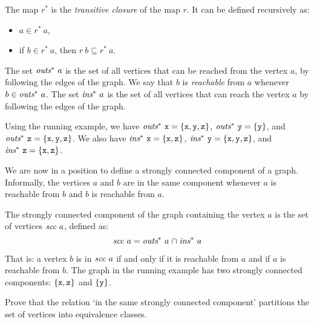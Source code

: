 \begin{definition}
The map $r^\ast$ is the {\em transitive closure\/} of the map $r$.  It can be defined recursively as:
\begin{itemize}
\item $a \in r^\ast ~ a$,
\item if $b \in r^\ast ~ a$, then
$r ~b \subseteq r^\ast~ a$.
\end{itemize}
\end{definition}
The set $\mbox{\it outs}^\ast ~a$ is the set of all vertices that can
be reached from the vertex $a$, by following the edges of the graph.
We say that $b$ is {\em reachable\/} from $a$ whenever $b\in\mbox{\it outs}^\ast ~a$.  The set
$\mbox{\it ins}^\ast~ a$ is the set of all vertices that can reach the
vertex $a$ by following the edges of the graph.

Using the running example, we have $\mbox{\it outs}^\ast~ \mbox{\tt x} =
\{\mbox{\tt x},\mbox{\tt y},\mbox{\tt z}\}$, $\mbox{\it outs}^\ast~ \mbox{\tt y} = \{\mbox{\tt y}\}$, and
$\mbox{\it outs}^\ast~ \mbox{\tt z} = \{\mbox{\tt x},\mbox{\tt y},\mbox{\tt z}\}$. We also have $\mbox{\it
ins}^\ast~ \mbox{\tt x} = \{\mbox{\tt x},\mbox{\tt z}\}$, $\mbox{\it ins}^\ast~ \mbox{\tt y} =
\{\mbox{\tt x},\mbox{\tt y},\mbox{\tt z}\}$, and $\mbox{\it ins}^\ast~ \mbox{\tt z} = \{\mbox{\tt x},\mbox{\tt z}\}$.

We are now in a position to define a strongly connected component
of a graph. Informally, the vertices $a$ and $b$ are in the same
component whenever $a$ is reachable from $b$ and $b$ is reachable from
$a$.
\begin{definition}
The strongly connected component of the graph containing the vertex
$a$ is the set of vertices $\mbox{\it scc} ~a$, defined as:
\[\mbox{\it scc} ~a = \mbox{\it outs}^\ast ~a \mathrel{\cap}
                      \mbox{\it ins}^\ast ~a \]
\end{definition}
That is: a vertex $b$ is in $\mbox{\it scc} ~a$ if and only if it is
reachable from $a$ and if $a$ is reachable from $b$. The graph in the
running example has two strongly connected components: $\{\mbox{\tt x},\mbox{\tt z}\}$
and $\{\mbox{\tt y}\}$.

\begin{exercise}\label{ll:X:equivclass}
Prove that the relation `in the same strongly connected component'
partitions the set of vertices into equivalence classes.
\end{exercise}

